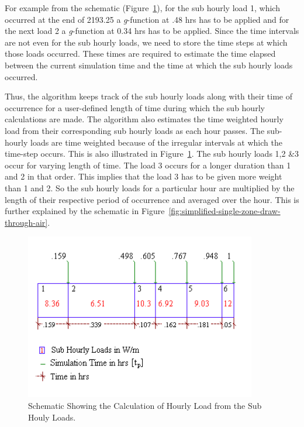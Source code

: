 For example from the schematic (Figure~\ref{fig:schematic-showing-the-calculation-of-hourly}), for the sub hourly load 1, which occurred at the end of 2193.25 a \emph{g}-function at .48 hrs has to be applied and for the next load 2 a \emph{g}-function at 0.34 hrs has to be applied. Since the time intervals are not even for the sub hourly loads, we need to store the time steps at which those loads occurred. These times are required to estimate the time elapsed between the current simulation time and the time at which the sub hourly loads occurred.

Thus, the algorithm keeps track of the sub hourly loads along with their time of occurrence for a user-defined length of time during which the sub hourly calculations are made. The algorithm also estimates the time weighted hourly load from their corresponding sub hourly loads as each hour passes. The sub-hourly loads are time weighted because of the irregular intervals at which the time-step occurs. This is also illustrated in Figure~\ref{fig:schematic-showing-the-calculation-of-hourly}. The sub hourly loads 1,2 \&3 occur for varying length of time. The load 3 occurs for a longer duration than 1 and 2 in that order. This implies that the load 3 has to be given more weight than 1 and 2. So the sub hourly loads for a particular hour are multiplied by the length of their respective period of occurrence and averaged over the hour. This is further explained by the schematic in Figure~\ref{fig:simplified-single-zone-draw-through-air}.

\begin{figure}[hbtp] %
\centering
\includegraphics[width=0.9\textwidth, height=0.9\textheight, keepaspectratio=true]{media/image5657.png}
\caption{  Schematic Showing the Calculation of Hourly Load from the Sub Houly Loads. \protect \label{fig:schematic-showing-the-calculation-of-hourly}}
\end{figure}

